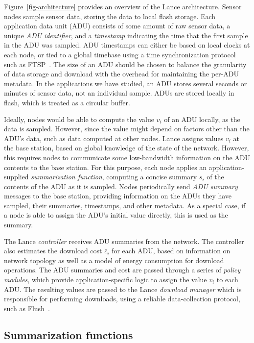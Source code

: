 Figure~\ref{fig-architecture} provides an overview of the Lance
architecture. Sensor nodes sample sensor data, storing the
data to local flash storage. Each application data unit (ADU)
consists of
some amount of raw sensor data, a unique {\em ADU identifier}, and a 
{\em timestamp} indicating the time that the first sample in the ADU
was sampled. ADU timestamps can either be based on local clocks at
each node, or tied to a global timebase using a time synchronization
protocol such as FTSP~\cite{ftsp}. The size of an ADU should be
chosen to balance the granularity of data storage and download with
the overhead for maintaining the per-ADU metadata. In the applications
we have studied, an ADU stores several seconds or minutes 
of sensor data, not an individual sample. ADUs are stored
locally in flash, which is treated as a circular buffer.

Ideally, nodes would be able to compute the value $v_i$ of an ADU
locally, as the data is sampled. However, since the value might depend
on factors other than the ADU's data, such as data computed at
other nodes. Lance assigns values $v_i$ at the base station,
based on global knowledge of the state of the network. However, this
requires nodes to communicate some low-bandwidth information on the ADU
contents to the base station.  For this purpose, each node applies an
application-supplied {\em summarization function}, computing a 
concise summary $s_i$ of the contents of the ADU as it is sampled.
Nodes periodically send {\em ADU summary} messages to the
base station, providing information on the ADUs they have sampled,
their summaries, timestamps, and other metadata. As a special case,
if a node is able to assign the ADU's initial value directly, this is used
as the summary.

The Lance {\em controller} receives ADU summaries from the network.
The controller also estimates the download cost $\bar{c}_i$ for each
ADU, based on information on network topology as well as a model of
energy consumption for download operations. The ADU summaries and cost
are passed through a series of {\em policy modules}, which provide
application-specific logic to assign the value $v_i$ to each ADU.
The resulting values are passed to the Lance {\em download manager}
which is responsible for performing downloads, using a reliable
data-collection protocol, such as Flush~\cite{flush-sensys07}.

\subsection{Summarization functions}

